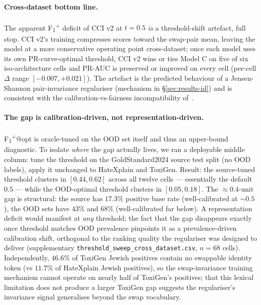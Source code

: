 \documentclass[10pt,a4paper]{article}
\begin{document}
\paragraph{Cross-dataset bottom line.} The apparent F\textsubscript{1}\textsuperscript{+}
deficit of CCI v2 at $t{=}0.5$ \emph{is} a threshold-shift artefact, full stop.
CCI v2's training compresses scores toward the swap-pair mean, leaving the
model at a more conservative operating point cross-dataset; once each model
uses its own PR-curve-optimal threshold, CCI v2 wins or ties Model C on
five of six iso-architecture cells and PR-AUC is preserved or improved
on every cell (per-cell $\Delta$ range $[-0.007, +0.021]$).  The artefact is the predicted behaviour of a
Jensen-Shannon pair-invariance regulariser
(mechanism in \S\ref{sec:results-id}) and is consistent with the
calibration-vs-fairness incompatibility
of~\citet{pleiss2017fairness}.

\paragraph{The gap is calibration-driven, not representation-driven.}
F\textsubscript{1}\textsuperscript{+}@opt is oracle-tuned on the OOD set
itself and thus an upper-bound diagnostic. To isolate \emph{where} the
gap actually lives, we ran a deployable middle column: tune the threshold
on the GoldStandard2024 source test split (no OOD labels), apply it
unchanged to HateXplain and ToxiGen. Result: the source-tuned threshold
clusters in $[0.44, 0.62]$ across all twelve cells --- essentially the
default $0.5$ --- while the OOD-optimal threshold clusters in
$[0.05, 0.18]$. The $\approx 0.4$-unit gap is structural: the source has
$17.3\%$ positive base rate (well-calibrated at $\sim 0.5$), the OOD
sets have $43\%$ and $68\%$ (well-calibrated far below). A representation
deficit would manifest at \emph{any} threshold; the fact that the gap
disappears exactly once threshold matches OOD prevalence pinpoints it
as a prevalence-driven calibration shift, orthogonal to the ranking
quality the regulariser was designed to deliver
(supplementary \texttt{threshold\_sweep\_cross\_dataset.csv}, $n{=}68$
cells). Independently, $46.6\%$ of ToxiGen Jewish positives contain no
swappable identity token (vs $11.7\%$ of HateXplain Jewish positives), so
the swap-invariance training mechanism cannot operate on nearly half of
ToxiGen's positives; that this lexical limitation does not produce a
larger ToxiGen gap suggests the regulariser's invariance signal
generalises beyond the swap vocabulary.
\end{document}
